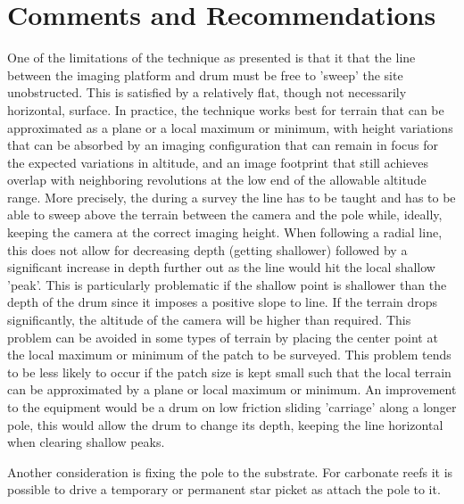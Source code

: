 \section{Comments and Recommendations}


One of the limitations of the technique as presented is that it that the line between the imaging platform and drum must be free to 'sweep' the site unobstructed. This is satisfied by a relatively flat, though not necessarily horizontal, surface. In practice, the technique works best for terrain that can be approximated as a plane or a local maximum or minimum, with height variations that can be absorbed by an imaging configuration that can remain in focus for the expected variations in altitude, and an image footprint that still achieves overlap with neighboring revolutions at the low end of the allowable altitude range.
More precisely, the during a survey the line has to be taught and has to be able to sweep above the terrain between the camera and the pole while, ideally, keeping the camera at the correct imaging height. When following a radial line, this does not allow for decreasing depth (getting shallower) followed by a significant increase in depth further out as the line would hit the local shallow 'peak'. This is particularly problematic if the shallow point is shallower than the depth of the drum since it imposes a positive slope to line. If the terrain drops significantly, the altitude of the camera will be higher than required. This problem can be avoided in some types of terrain by placing the center point at the local maximum or minimum of the patch to be surveyed. 
This problem tends to be less likely to occur if the patch size is kept small such that the local terrain can be approximated by a plane or local maximum or minimum. An improvement to the equipment would be a drum on low friction sliding 'carriage' along a longer pole, this would allow the drum to change its depth, keeping the line horizontal when clearing shallow peaks.

Another consideration is fixing the pole to the substrate. For carbonate reefs it is possible to drive a temporary or permanent star picket as attach the pole to it.